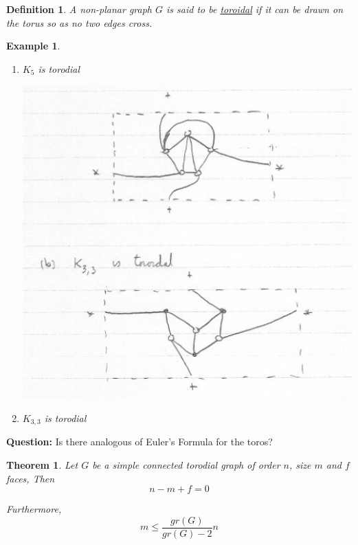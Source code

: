 \documentclass[12pt]{article}
\newtheorem{theorem}{Theorem}
\newtheorem{example}{Example}
\newtheorem{definition}{Definition}
\begin{document}
\begin{definition}
A non-planar graph $G$ is said to be \underline{toroidal} if it can be drawn on the torus so as no two edges cross.
\end{definition}


\begin{example}
  \begin{enumerate}
    \item $K_{5}$ is torodial

          \begin{center}
            \includegraphics[scale=0.5]{torodial}
          \end{center}

    \item $K_{3,3}$ is torodial

  \end{enumerate}

\end{example}


\textbf{Question:} Is there analogous of Euler's Formula for the toros?


\begin{theorem}
  Let $G$ be a simple connected torodial graph of order $n$, size $m$ and $f$ faces, Then
  \[n - m + f = 0\]

  Furthermore,
  \[m \le \frac{gr(G)}{gr(G) - 2} n\]
\end{theorem}
\end{document}
